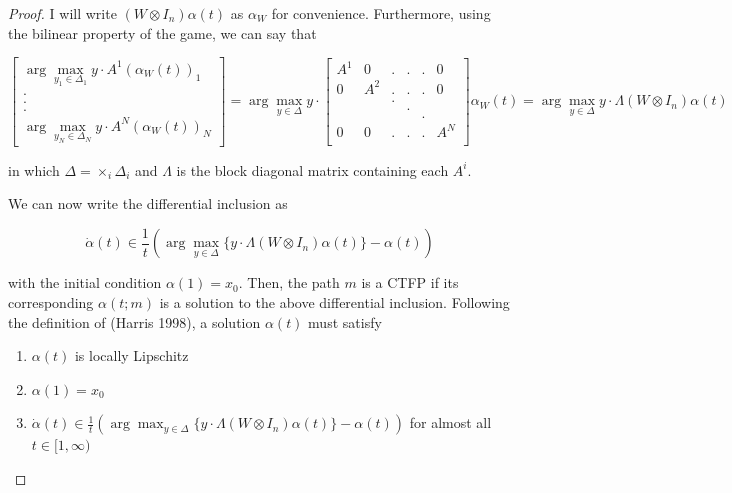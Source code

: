 \documentclass{article}
\theoremstyle{definition}
\begin{document}
\begin{proof}
		I will write $(W \otimes I_n) \alpha(t)$ as $\alpha_W$ for convenience. Furthermore, using
		the bilinear property of the game, we can say that

		\begin{equation}
			\begin{bmatrix}
				\arg\max_{y_1 \in \Delta_1} y \cdot A^1 ( \alpha_W(t))_1 \\
				.\\
				.\\
				.\\
				\arg \max_{y_N \in \Delta_N} y \cdot A^N (\alpha_W(t))_N 
			\end{bmatrix} = 
			\arg \max_{y \in \Delta} y \cdot \begin{bmatrix}
				A^1 & 0 & . & . & . & 0 \\
				0 & A^2 & . & . & . & 0 \\
				& & . & & & \\
				& & & . & & \\
				& & & & . & \\
				0 & 0 & . & . & . & A^N \\
			\end{bmatrix} \alpha_W(t) = \arg\max_{y \in \Delta} y \cdot \Lambda (W \otimes I_n)
			\alpha(t)
		\end{equation}

		in which $\Delta = \times_i \Delta_i$ and $\Lambda$ is the block diagonal matrix containing
		each $A^i$. 

		We can now write the differential inclusion as

		\begin{equation}
			\dot{\alpha}(t) \in \frac{1}{t} (\arg \max_{y \in \Delta}  \{y \cdot \Lambda (W \otimes
			I_n)
			\alpha(t) \}- \alpha(t))
		\end{equation}

		with the initial condition $\alpha(1) = x_0$. Then, the path $m$ is a CTFP if its
		corresponding $\alpha(t; m)$ is a solution to the above differential inclusion. Following
		the definition of (Harris 1998), a solution $\alpha(t)$ must satisfy

		\begin{enumerate}
			\item $\alpha(t)$ is locally Lipschitz
			\item $\alpha(1) = x_0$
			\item $\dot{\alpha}(t) \in \frac{1}{t} (\arg \max_{y \in \Delta}  \{y \cdot \Lambda (W \otimes
			I_n)
			\alpha(t) \}- \alpha(t))$ for almost all $t \in [1, \infty)$ 
		\end{enumerate}


\end{proof}
\end{document}
